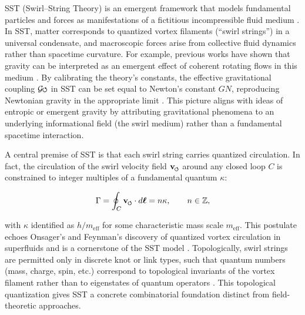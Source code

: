 \documentclass[12pt]{article}
\DeclareRobustCommand{\swirlarrow}{
\mathchoice{\mkern-2mu\scriptstyle\boldsymbol{\circlearrowleft}}%
{\mkern-2mu\scriptstyle\boldsymbol{\circlearrowleft}}%
{\mkern-2mu\scriptscriptstyle\boldsymbol{\circlearrowleft}}%
{\mkern-2mu\scriptscriptstyle\boldsymbol{\circlearrowleft}}
}%
\newcommand{\Gswirl}{\mathcal{G}\swirlarrow}
\begin{document}
SST (Swirl--String Theory) is an emergent framework that models fundamental particles and forces as manifestations of a fictitious incompressible fluid medium \cite{Iskandarani2025Canon}. In SST, matter corresponds to quantized vortex filaments (``swirl strings'') in a universal condensate, and macroscopic forces arise from collective fluid dynamics rather than spacetime curvature. For example, previous works have shown that gravity can be interpreted as an emergent effect of coherent rotating flows in this medium \cite{Iskandarani2025RotatingFrame}. By calibrating the theory's constants, the effective gravitational coupling $\Gswirl$ in SST can be set equal to Newton's constant $G{N}$, reproducing Newtonian gravity in the appropriate limit \cite{Iskandarani2025Canon}. This picture aligns with ideas of entropic or emergent gravity \cite{Verlinde2011,Verlinde2017,Jacobson1995,Padmanabhan2010} by attributing gravitational phenomena to an underlying informational field (the swirl medium) rather than a fundamental spacetime interaction.




A central premise of SST is that each swirl string carries quantized circulation. In fact, the circulation of the swirl velocity field $\mathbf{v}_{\swirlarrow}$ around any closed loop $C$ is constrained to integer multiples of a fundamental quantum $\kappa$:

\begin{equation}\label{eq:circulation}

\Gamma = \oint_C \mathbf{v}_{\swirlarrow}\cdot d\boldsymbol{\ell} = n\kappa, \qquad n \in \mathbb{Z},
\end{equation}

with $\kappa$ identified as $h/m_\text{eff}$ for some characteristic mass scale $m_\text{eff}$. This postulate echoes Onsager's and Feynman's discovery of quantized vortex circulation in superfluids and is a cornerstone of the SST model \cite{Onsager1949,Feynman1955}. Topologically, swirl strings are permitted only in discrete knot or link types, such that quantum numbers (mass, charge, spin, etc.) correspond to topological invariants of the vortex filament rather than to eigenstates of quantum operators \cite{Iskandarani2025Canon}. This topological quantization gives SST a concrete combinatorial foundation distinct from field-theoretic approaches.
\end{document}
